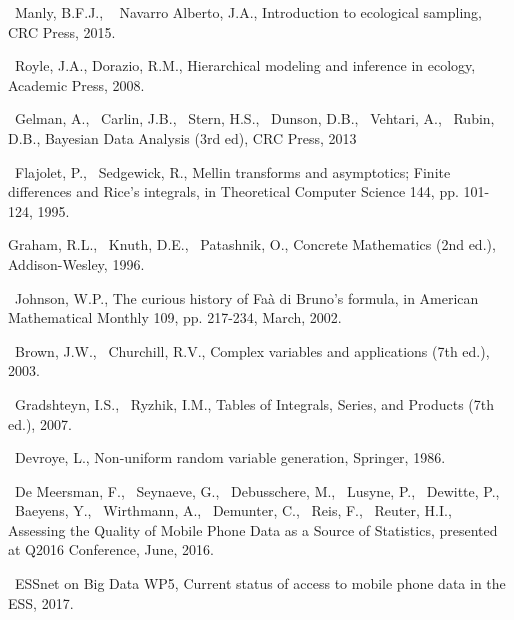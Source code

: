 \documentclass[12pt,leqno]{article}
\begin{document}
\begin{thebibliography}{99}

~Manly, B.F.J., ~ Navarro Alberto, J.A., Introduction to ecological sampling,
CRC Press, 2015.

~Royle, J.A., Dorazio, R.M., Hierarchical modeling and inference in ecology,
Academic Press, 2008.

~Gelman, A., ~Carlin, J.B., ~Stern, H.S., ~Dunson, D.B., ~Vehtari, A., ~Rubin, D.B., Bayesian Data Analysis (3rd ed), CRC Press, 2013

~Flajolet, P., ~Sedgewick, R.,  Mellin transforms and asymptotics; Finite differences and Rice's integrals,
in  Theoretical Computer Science 144, pp. 101-124, 1995.


Graham, R.L., ~Knuth, D.E., ~Patashnik, O., Concrete Mathematics (2nd ed.), 
Addison-Wesley, 1996.


~Johnson, W.P., The curious history of Faà di Bruno's formula, in 
American Mathematical Monthly 109, pp. 217-234, March, 2002.


~Brown, J.W., ~Churchill, R.V., Complex variables and applications (7th ed.), 2003.

~Gradshteyn, I.S., ~Ryzhik, I.M., Tables of Integrals, Series, and Products (7th ed.),
2007.

~Devroye, L., Non-uniform random variable generation, Springer, 1986.

~De Meersman, F., ~Seynaeve, G., ~Debusschere, M., ~Lusyne, P., ~Dewitte, P., 
~Baeyens, Y., ~Wirthmann, A., ~Demunter, C., ~Reis, F., ~Reuter, H.I.,
Assessing the Quality of Mobile Phone Data as a Source of Statistics,
presented at Q2016 Conference, June, 2016.

~ESSnet on Big Data WP5, Current status of access to mobile phone data in the ESS, 2017.
 
\end{thebibliography}
\end{document}
